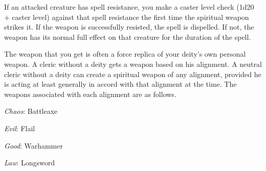 {	If an attacked creature has spell resistance, you make a caster level check (1d20 + caster level) against that spell resistance the first time the spiritual weapon strikes it. If the weapon is successfully resisted, the spell is dispelled. If not, the weapon has its normal full effect on that creature for the duration of the spell.

	The weapon that you get is often a force replica of your deity's own personal weapon. A cleric without a deity gets a weapon based on his alignment. A neutral cleric without a deity can create a spiritual weapon of any alignment, provided he is acting at least generally in accord with that alignment at the time. The weapons associated with each alignment are as follows.

	\textit{Chaos}:
	Battleaxe

	\textit{Evil}:
Flail

	\textit{Good}:
	Warhammer

	\textit{Law}:
	Longsword

}

